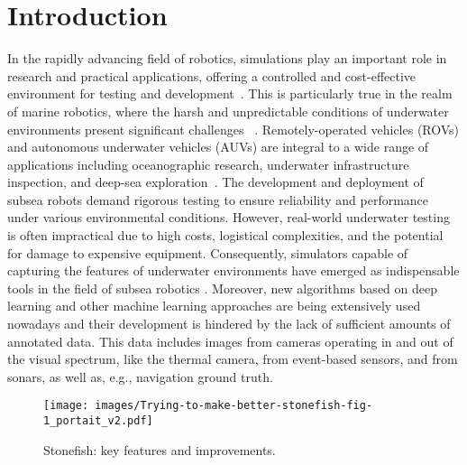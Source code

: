 \section{Introduction}

In the rapidly advancing field of robotics, simulations play an important role in research and practical applications, offering a controlled and cost-effective environment for testing and development~\cite{liu2021role}. This is particularly true in the realm of marine robotics, where the harsh and unpredictable conditions of underwater environments present significant challenges ~\cite{Grimaldi2023InvestigationOT}. Remotely-operated vehicles (ROVs) and autonomous underwater vehicles (AUVs) are integral to a wide range of applications including oceanographic research, underwater infrastructure inspection, and deep-sea exploration~\cite{petillot2019underwater,10801590}. The development and deployment of subsea robots demand rigorous testing to ensure reliability and performance under various environmental conditions. However, real-world underwater testing is often impractical due to high costs, logistical complexities, and the potential for damage to expensive equipment. Consequently, simulators capable of capturing the features of underwater environments have emerged as indispensable tools in the field of subsea robotics \cite{sim_review}\cite{adetunji2024digitaltwinssurfaceenhancing}. Moreover, new algorithms based on deep learning and other machine learning approaches are being extensively used nowadays and their development is hindered by the lack of sufficient amounts of annotated data. 
This data includes images from cameras operating in and out of the visual spectrum, like the thermal camera, from event-based sensors, and from sonars, as well as, e.g., navigation ground truth.

\begin{figure}[t]
    \centering
    \texttt{[image: images/Trying-to-make-better-stonefish-fig-1\_portait\_v2.pdf]}
    \caption{Stonefish: key features and improvements.}
    \label{fig:stonefish}
\end{figure}


